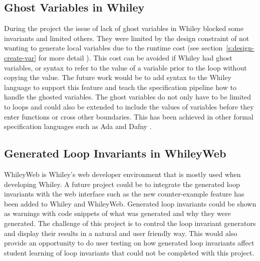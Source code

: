 \subsection{Ghost Variables in Whiley}

During the project the issue of lack of ghost variables in Whiley blocked some
invariants and limited others.
They were limited by the design constraint of not wanting to generate local
variables due to the runtime cost (see section~\ref{s:design-create-var} for
more detail ).
This cost can be avoided if Whiley had ghost variables, or syntax to refer to
the value of a variable prior to the loop without copying the value.
The future work would be to add syntax to the Whiley language to support this
feature and teach the specification pipeline how to handle the ghosted
variables.
The ghost variables do not only have to be limited to loops and could also be 
extended to include the values of variables before they enter functions or
cross other boundaries.
This has been achieved in other formal specification languages such as Ada and
Dafny \cite{dafny-lang}.

\subsection{Generated Loop Invariants in WhileyWeb}

WhileyWeb is Whiley's web developer environment that is mostly used when
developing Whiley.
A future project could be to integrate the generated loop invariants with
the web interface such as the new counter-example feature has been added to
Whiley and WhileyWeb.
Generated loop invariants could be shown as warnings with code snippets of what
was generated and why they were generated.
The challenge of this project is to control the loop invariant
generators and display their results in a natural and user friendly way.
This would also provide an opportunity to do user testing on how generated
loop invariants affect student learning of loop invariants that could not be
completed with this project.

